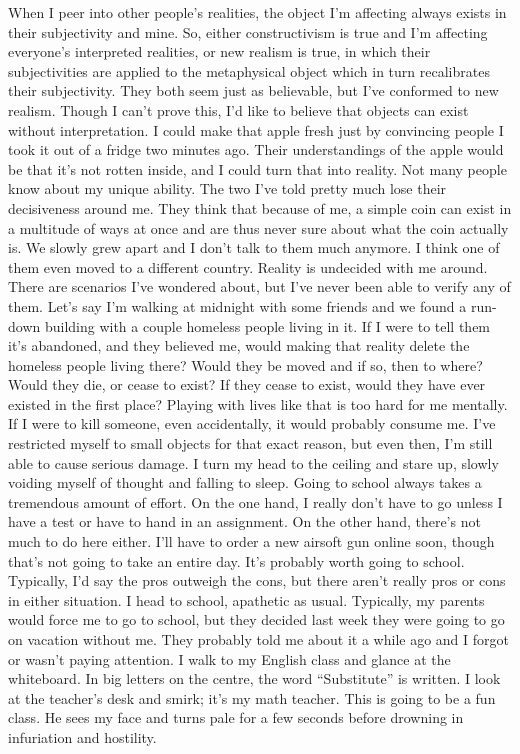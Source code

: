 \documentclass[a4paper, 12pt]{book}
\begin{document}
When I peer into other people’s realities, the object I’m affecting always exists in their subjectivity and mine. So, either constructivism is true and I’m affecting everyone’s interpreted realities, or new realism is true, in which their subjectivities are applied to the metaphysical object which in turn recalibrates their subjectivity. They both seem just as believable, but I’ve conformed to new realism. Though I can’t prove this, I’d like to believe that objects can exist without interpretation. I could make that apple fresh just by convincing people I took it out of a fridge two minutes ago. Their understandings of the apple would be that it’s not rotten inside, and I could turn that into reality. Not many people know about my unique ability. The two I’ve told pretty much lose their decisiveness around me. They think that because of me, a simple coin can exist in a multitude of ways at once and are thus never sure about what the coin actually is. We slowly grew apart and I don’t talk to them much anymore. I think one of them even moved to a different country.
\newline
\tab
Reality is undecided with me around. There are scenarios I’ve wondered about, but I’ve never been able to verify any of them. Let’s say I’m walking at midnight with some friends and we found a run-down building with a couple homeless people living in it. If I were to tell them it’s abandoned, and they believed me, would making that reality delete the homeless people living there? Would they be moved and if so, then to where? Would they die, or cease to exist? If they cease to exist, would they have ever existed in the first place? Playing with lives like that is too hard for me mentally. If I were to kill someone, even accidentally, it would probably consume me. I’ve restricted myself to small objects for that exact reason, but even then, I’m still able to cause serious damage. I turn my head to the ceiling and stare up, slowly voiding myself of thought and falling to sleep. 
\newline
\tab
Going to school always takes a tremendous amount of effort. On the one hand, I really don’t have to go unless I have a test or have to hand in an assignment. On the other hand, there’s not much to do here either. I’ll have to order a new airsoft gun online soon, though that’s not going to take an entire day. It’s probably worth going to school. Typically, I’d say the pros outweigh the cons, but there aren’t really pros or cons in either situation.
\newline
\tab
I head to school, apathetic as usual. Typically, my parents would force me to go to school, but they decided last week they were going to go on vacation without me. They probably told me about it a while ago and I forgot or wasn’t paying attention. I walk to my English class and glance at the whiteboard. In big letters on the centre, the word ``Substitute'' is written. I look at the teacher’s desk and smirk; it’s my math teacher. This is going to be a fun class. He sees my face and turns pale for a few seconds before drowning in infuriation and hostility.
\end{document}
